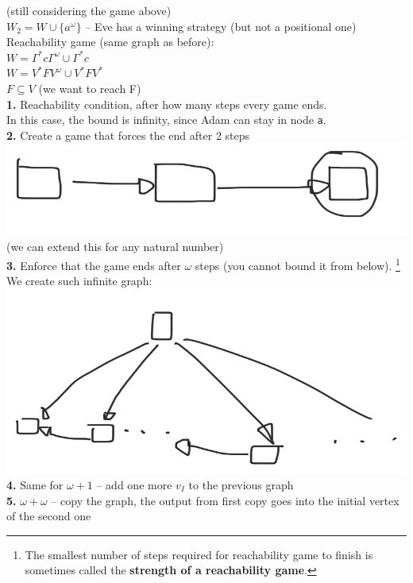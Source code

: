 \noindent
(still considering the game above)\\
$W_2 = W \cup \{a^{\omega}\}$ -- Eve has a winning strategy (but not a positional one)\\

\noindent
Reachability game (same graph as before):\\
$W = \Gamma^{*}c\Gamma^{\omega} \cup \Gamma^{*}c$\\
$W = V^{*}FV^{\omega} \cup V^{*}FV^{*}$\\
$F \subseteq V$ (we want to reach F)\\
\textbf{1.} Reachability condition, after how many steps every game ends.\\
In this case, the bound is infinity, since Adam can stay in node \texttt{a}.\\
\textbf{2.} Create a game that forces the end after 2 steps
\includegraphics[scale=0.1]{content/graphics/game2}
(we can extend this for any natural number)\\
\textbf{3.} Enforce that the game ends after $\omega$ steps (you cannot bound it from below).
\footnote{
The smallest number of steps required for reachability game to finish is sometimes called the
\textbf{strength of a reachability game}.
}\\
We create such infinite graph:
\includegraphics[scale=0.1]{content/graphics/game3}\\
\textbf{4.} Same for $\omega+1$ -- add one more $v_I$ to the previous graph\\
\textbf{5.} $\omega + \omega$ -- copy the graph, the output from first copy goes into the initial vertex of the second one\\

